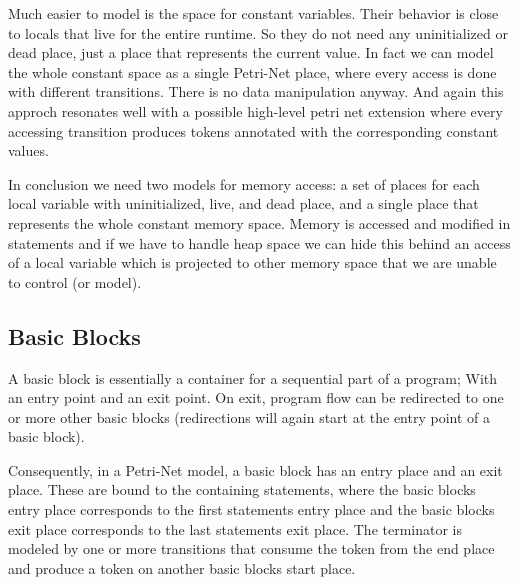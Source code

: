 Much easier to model is the space for constant variables.
Their behavior is close to locals that live for the entire runtime.
So they do not need any uninitialized or dead place, just a place that represents the current value.
In fact we can model the whole constant space as a single Petri-Net place, where every access is done with different transitions.
There is no data manipulation anyway.
And again this approch resonates well with a possible high-level petri net extension where every accessing transition produces tokens annotated with the corresponding constant values.

In conclusion we need two models for memory access: a set of places for each local variable with uninitialized, live, and dead place, and a single place that represents the whole constant memory space.
Memory is accessed and modified in statements and if we have to handle heap space we can hide this behind an access of a local variable which is projected to other memory space that we are unable to control (or model).

\subsection{Basic Blocks}
A basic block is essentially a container for a sequential part of a program; 
With an entry point and an exit point.
On exit, program flow can be redirected to one or more other basic blocks (redirections will again start at the entry point of a basic block).

Consequently, in a Petri-Net model, a basic block has an entry place and an exit place.
These are bound to the containing statements, where the basic blocks entry place corresponds to the first statements entry place and the basic blocks exit place corresponds to the last statements exit place.
The terminator is modeled by one or more transitions that consume the token from the end place and produce a token on another basic blocks start place.

